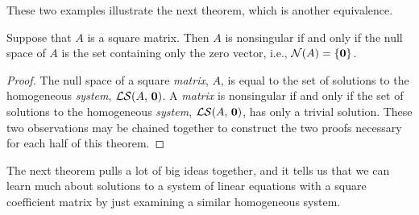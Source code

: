 \documentclass{ximera}
\begin{document}
These two examples illustrate the next theorem, which is another equivalence.

\begin{theorem}
\label{theorem:NMTNS}

Suppose that $A$ is a square matrix.  Then $A$ is nonsingular if and only if the null space of $A$ is the set containing only the zero vector, i.e.,  $\mathcal{N}\!\left(A\right)=\left\{\mathbf{0}\right\}$.

\begin{proof}
  The null space of a square \textit{matrix}, $A$, is equal to the set
  of solutions to the homogeneous \textit{system}, $\mathcal{LS}\!\left(A,\,\mathbf{0}\right)$.
  A \textit{matrix} is nonsingular if and only if the set of solutions
  to the homogeneous \textit{system}, $\mathcal{LS}\!\left(A,\,\mathbf{0}\right)$,
  has only a trivial solution.  These two observations may be chained
  together to construct the two proofs necessary for each half of this
  theorem.
\end{proof}
\end{theorem}

The next theorem pulls a lot of big ideas together, and it tells us
that we can learn much about solutions to a system of linear equations
with a square coefficient matrix by just examining a similar
homogeneous system.
\end{document}
